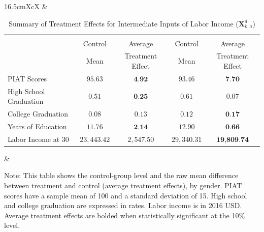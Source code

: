 \begin{table}[!htbpt]
\begin{threeparttable}
\caption{Summary of Treatment Effects for Intermediate Inputs of Labor Income ($\bm{X}^d_{k,a}$)} \label{table:summint}
\centering
\footnotesize
\begin{tabularx}{16.5cm}{XcX}
& \begin{tabular}{lcccc} \toprule
& \mc{2}{c}{Females} & \mc{2}{c}{Males} \\
& Control & Average & Control & Average  \\
& Mean & Treatment Effect & Mean & Treatment Effect  \\
\midrule
PIAT Scores & $     95.63 $  & $      \textbf{4.92} $ & $     93.46 $ & $      \textbf{7.70} $ \\
High School Graduation & $      0.51 $ & $     \textbf{0.25} $ & $      0.61 $ & $      0.07 $ \\
College Graduation & $      0.08 $ & $      0.13 $ & $      0.12 $ & $      \textbf{0.17} $ \\
Years of Education & $     11.76 $ & $      \textbf{2.14} $ & $     12.90 $ & $      \textbf{0.66} $ \\
Labor Income at 30  & $ 23,443.42 $ & $  2,547.50 $ & $ 29,340.31 $ & $\textbf{19,809.74} $ \\ \bottomrule
\end{tabular} & 
\end{tabularx}
\begin{tablenotes}
\footnotesize
\item Note: This table shows the control-group level and the raw mean difference between treatment and control (average treatment effects), by gender. PIAT scores have a sample mean of 100 and a standard deviation of 15. High school and college graduation are expressed in rates. Labor income is in 2016 USD. Average treatment effects are bolded when statistically significant at the 10\% level.
\end{tablenotes}
\end{threeparttable}
\end{table}

